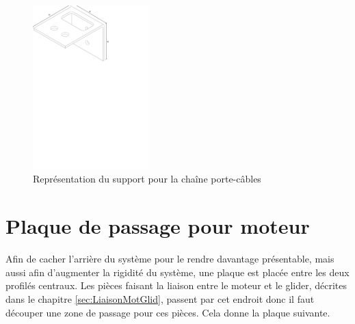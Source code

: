\begin{figure}[H]
    \centering
    \includegraphics[width = 0.4\textwidth]{assets/figures/SupportChaineCable.svg}
    \caption{Représentation du support pour la chaîne porte-câbles}
    \label{fig:SupChaineCable}
\end{figure}

\section{Plaque de passage pour moteur}\label{sec:PlaPassMot}
Afin de cacher l'arrière du système pour le rendre davantage présentable, mais aussi afin d'augmenter la rigidité du système, une plaque est placée
entre les deux profilés centraux. Les pièces faisant la liaison entre le moteur et le glider, décrites dans le chapitre \ref{sec:LiaisonMotGlid},
passent par cet endroit donc il faut découper une zone de passage pour ces pièces. Cela donne la plaque suivante.

